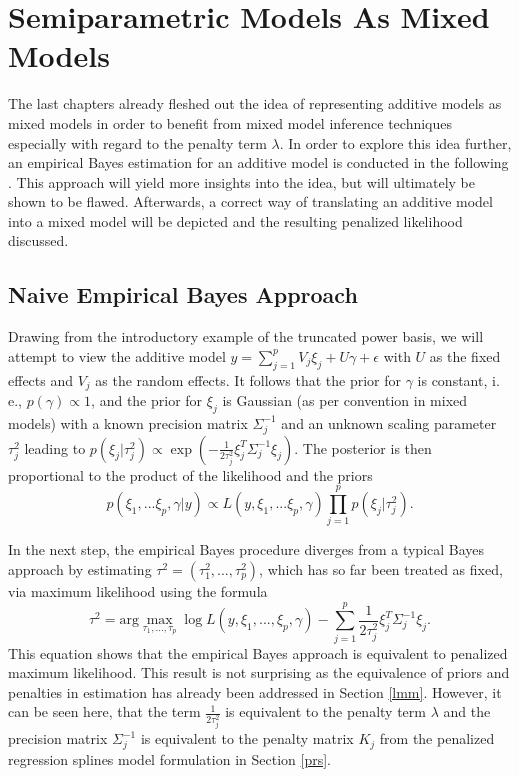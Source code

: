 \documentclass[12pt]{article}
\begin{document}
\section{Semiparametric Models As Mixed Models}\label{representation} %


The last chapters already fleshed out the idea of representing additive models as mixed models in order to benefit from mixed model inference techniques especially with regard to the penalty term $\lambda$. In order to explore this idea further, an empirical Bayes estimation for an additive model is conducted in the following \cite{kneib2006mixed}. This approach will yield more insights into the idea, but will ultimately be shown to be flawed. Afterwards, a correct way of translating an additive model into a mixed model will be depicted and the resulting penalized likelihood discussed.

\subsection{Naive Empirical Bayes Approach}

Drawing from the introductory example of the truncated power basis, we will attempt to view the additive model $y = \sum_{j=1}^p V_j \xi_j + U \gamma + \epsilon$ with $U$ as the fixed effects and $V_j$ as the random effects. It follows that the prior for $\gamma$ is constant, i.\,e., $p(\gamma) \propto 1$, and the prior for $\xi_j$ is Gaussian (as per convention in mixed models) with a known precision matrix $\Sigma^{-1}_j$ and an unknown scaling parameter $\tau^2_j$ leading to $p(\xi_j|\tau_j^2)  \propto \exp\left(-\frac{1}{2\tau^2_j} \xi_j^T\Sigma^{-1}_j \xi_j\right) $. The posterior is then proportional to the product of the likelihood and the priors
$$p(\xi_1, ... \xi_p, \gamma|y) \propto L(y,\xi_1, ... \xi_p, \gamma)\prod_{j=1}^p p(\xi_j|\tau_j^2). $$

In the next step, the empirical Bayes procedure diverges from a typical Bayes approach by estimating $\tau^2 = (\tau^2_1,..., \tau^2_p)$, which has so far been treated as fixed, via maximum likelihood using the formula
$$\tau^2 = \text{arg}\max_{\tau_1, ..., \tau_p} \log L(y, \xi_1,...,\xi_p, \gamma) - \sum_{j=1}^p \frac{1}{2\tau^2_j} \xi_j^T \Sigma^{-1}_j \xi_j.$$
This equation shows that the empirical Bayes approach is equivalent to penalized maximum likelihood. This result is not surprising as the equivalence of priors and penalties in estimation has already been addressed in Section \ref{lmm}. However, it can be seen here, that the term $\frac{1}{2\tau^2_j}$ is equivalent to the penalty term $\lambda$ and the precision matrix $\Sigma^{-1}_j$ is equivalent to the penalty matrix $K_j$ from the penalized regression splines model formulation in Section \ref{prs}. 
\end{document}
